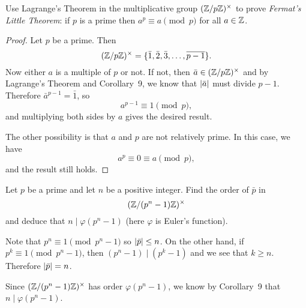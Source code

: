  Use Lagrange's Theorem in the multiplicative group
$(\mathbb{Z}/p\mathbb{Z})^\times$ to prove {\em Fermat's Little Theorem}: if $p$ is a
prime then $a^p\equiv a\pmod{p}$ for all $a\in\mathbb{Z}$.
\begin{proof}
  Let $p$ be a prime. Then
  \begin{equation*}
    (\mathbb{Z}/p\mathbb{Z})^\times = \{\bar1,\bar2,\bar3,\dots,\overline{p-1}\}.
  \end{equation*}
  Now either $a$ is a multiple of $p$ or not. If not, then
  $\bar{a}\in(\mathbb{Z}/p\mathbb{Z})^\times$ and by Lagrange's Theorem and
  Corollary~9, we know that $\lvert{\bar{a}}\rvert$ must divide
  $p-1$. Therefore $\bar{a}^{p-1} = \bar1$, so
  \begin{equation*}
    a^{p-1}\equiv 1\pmod{p},
  \end{equation*}
  and multiplying both sides by $a$ gives the desired result.

  The other possibility is that $a$ and $p$ are not relatively
  prime. In this case, we have
  \begin{equation*}
    a^p\equiv0\equiv a\pmod{p},
  \end{equation*}
  and the result still holds.
\end{proof}

 Let $p$ be a prime and let $n$ be a positive
integer. Find the order of $\bar{p}$ in
\begin{equation*}
  (\mathbb{Z}/(p^n-1)\mathbb{Z})^\times
\end{equation*}
and deduce that $n\mid\varphi(p^n-1)$ (here $\varphi$ is Euler's
function).
\begin{solution}
  Note that $p^n\equiv1\pmod{p^n-1}$ so $\lvert{\bar p}\rvert\leq n$. On the
  other hand, if $p^k\equiv1\pmod{p^n-1}$, then $(p^n-1)\mid(p^k-1)$
  and we see that $k\geq n$. Therefore $\lvert{\bar p}\rvert = n$.

  Since $(\mathbb{Z}/(p^n-1)\mathbb{Z})^\times$ has order $\varphi(p^n - 1)$, we know
  by Corollary~9 that $n\mid\varphi(p^n-1)$.
\end{solution}
